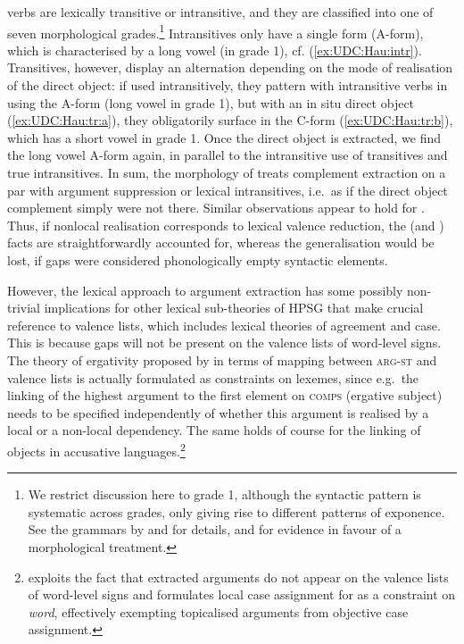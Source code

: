 \documentclass[output=paper
,notxmath 
	        ,collection
	        ,collectionchapter
 	        ,biblatex
                ,babelshorthands
                ,newtxmath
                ,draftmode
                ,colorlinks, citecolor=brown
]{langscibook}
\begin{document}
\noindent
{} verbs are lexically transitive or intransitive, and they are
classified into one of seven morphological grades.\footnote{We
  restrict discussion here to grade 1, although the syntactic pattern
  is systematic across grades, only giving rise to different patterns
  of exponence. See the  grammars by \citet{newman_p00} and
  \citet{jaggar01:_hausa} for details, and \citet{crysmann_b04yom} for
  evidence in favour of a morphological treatment. } Intransitives
only have a single form (A-form), which is characterised by a long
vowel (in grade 1), cf. (\ref{ex:UDC:Hau:intr}). Transitives, however,
display an alternation depending on the mode of realisation of the
direct object: if used intransitively, they pattern with intransitive verbs
in using the A-form (long vowel in grade 1), but with an in situ
direct object (\ref{ex:UDC:Hau:tr:a}), they obligatorily surface in the
C-form (\ref{ex:UDC:Hau:tr:b}), which has a short vowel in grade
1. Once the direct object is extracted, we find the long vowel A-form
again, in parallel to the intransitive use of transitives and true
intransitives. In sum, the morphology of  treats complement
extraction on a par with argument suppression or lexical
intransitives, i.e.\ as if the direct object complement simply were not
there. Similar observations appear to hold for 
\citep[Section~4.2.3]{Henri2010a-u}. Thus, if nonlocal realisation corresponds to lexical
valence reduction, the  (and ) facts are
straightforwardly accounted for, whereas the generalisation would be
lost, if gaps were considered phonologically empty syntactic elements.


However, the lexical approach to argument extraction has some possibly
non-trivial implications for other lexical sub-theories of HPSG that
make crucial reference to valence lists, which includes lexical
theories of agreement and case. This is because gaps will not be
present on the valence lists of word-level signs. The theory of
ergativity proposed by \citet[Section~5.2]{Manning:Sag:99} in terms of
mapping between \textsc{arg-st} and valence lists is actually
formulated as constraints on lexemes, since e.g.\ the linking of the
highest argument to the first element on \textsc{comps} (ergative
subject) needs to be specified independently of whether this argument
is realised by a local or a non-local dependency. The same holds of
course for the linking of objects in accusative
languages.\footnote{\citet{Crysmann:09} exploits the fact that
  extracted arguments do not appear on the valence lists of word-level
  signs and formulates local case assignment for  as a
  constraint on \textit{word}, effectively exempting topicalised
  arguments from objective case assignment.}
\end{document}
